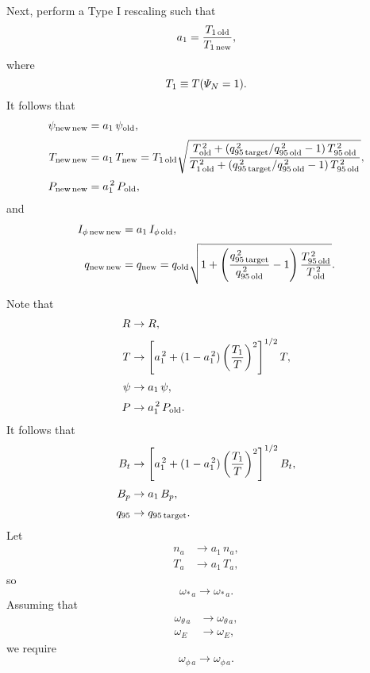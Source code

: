 \documentclass[12pt]{article}
\begin{document}
Next, perform a Type I rescaling such that 
\begin{equation}
a_1 = \frac{T_{1\,{\rm old}}}{T_{1\,{\rm new}}},
\end{equation}
where 
\begin{equation}
T_{1}\equiv  T({\mit\Psi}_N=1).
\end{equation}
It follows that 
\begin{align}
\psi_{\rm new\,new} &= a_1\,\psi_{\rm old},\\[0.5ex]
T_{\rm new\,new} &=a_1\,T_{\rm new} = T_{1\,{\rm old}}
\sqrt{
\frac{T_{\rm old}^{\,2} + (q_{95\,{\rm target}}^{\,2}/q_{95\,{\rm old}}^{\,2}-1)\,T_{95\,{\rm old}}^{\,2}}
{T_{1\,{\rm old}}^{\,2} + (q_{95\,{\rm target}}^{\,2}/q_{95\,{\rm old}}^{\,2}-1)\,T_{95\,{\rm old}}^{\,2}}
},
\\[0.5ex]
P_{\rm new\,new} &=a_1^{\,2}\,P_{\rm old},
\end{align}
and
\begin{align}
I_{\phi\,{\rm new\,new}} &= a_1\,I_{\phi\,{\rm old}},\\[0.5ex]
q_{\rm new\,new} &= q_{\rm new}= q_{\rm old}\sqrt{1 +\left(\frac{q_{95\,{\rm target}}^{\,2}}{q_{95\,{\rm old}}^{\,2}}-1\right)\frac{T_{95\,{\rm old}}^{\,2}}{T_{\rm old}^{\,2}}}.
\end{align}

Note that
\begin{align}
R&\rightarrow R,\\[0.5ex]
T &\rightarrow  \left[a_1^{\,2}+ (1-a_1^{\,2})\left(\frac{T_{1}}{T}\right)^2\right]^{1/2}T,\\[0.5ex]
\psi&\rightarrow a_1\,\psi,\\[0.5ex]
P &\rightarrow a_1^{\,2}\,P_{\rm old}.
\end{align}
It follows that
\begin{align}
B_t&\rightarrow \left[a_1^{\,2}+ (1-a_1^{\,2})\left(\frac{T_{1}}{T}\right)^2\right]^{1/2}B_t,\\[0.5ex]
B_p &\rightarrow a_1\,B_p,\\[0.5ex]
q_{95} &\rightarrow q_{95\,{\rm target}}.
\end{align}
Let
\begin{align}
n_a&\rightarrow a_1\,n_a,\\[0.5ex]
T_a&\rightarrow a_1\,T_a,
\end{align}
so
\begin{equation}
\omega_{\ast\,a} \rightarrow \omega_{\ast\,a}.
\end{equation}
Assuming that
\begin{align}
\omega_{\theta\,a}&\rightarrow \omega_{\theta\,a},\\[0.5ex]
\omega_E &\rightarrow \omega_E,
\end{align}
we require 
\begin{equation}
\omega_{\phi\,a}\rightarrow \omega_{\phi\,a}.
\end{equation}
\end{document}
